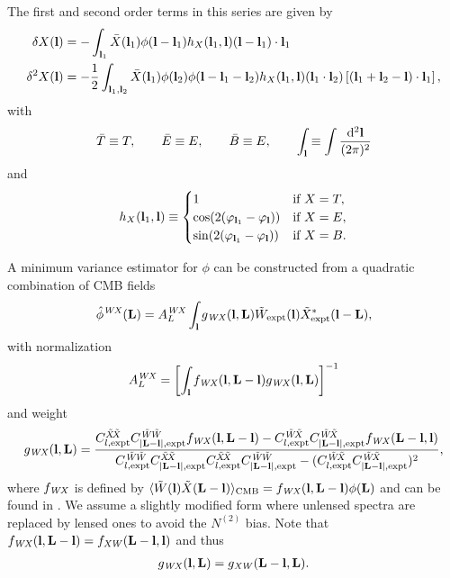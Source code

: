 \documentclass[prd,superscriptaddress,nofootinbib,floatfix,notitlepage]{revtex4-1}
\begin{document}
The first and second order terms in this series are given by
\begin{align}
  \label{eq:21}
  \delta X({\bf l}) &= -\int_{{\bf l}_1}\bar{X}({\bf l}_1)\phi({\bf l}-{\bf l}_1)h_X({\bf l}_1,{\bf l})({\bf l}-{\bf l}_1)\cdot {\bf l}_1 \\
  \delta^2 X({\bf l}) &= -\frac{1}{2}\int_{{\bf l}_1,{\bf l}_2}\bar{X}({\bf l}_1)\phi({\bf l}_2)\phi({\bf l}-{\bf l}_1-{\bf l}_2)h_X({\bf l}_1,{\bf l})({\bf l}_1\cdot{\bf l}_2)\left[({\bf l}_1+{\bf l}_2-{\bf l})\cdot{\bf l}_1\right],
\end{align}
with
\begin{equation}
  \label{eq:22}
  \bar{T}\equiv T,\qquad\bar{E}\equiv E,\qquad \bar{B} \equiv E,\qquad \int_{\bf l}\equiv\int\frac{{\rm d}^2 {\bf l}}{(2\pi)^2}
\end{equation}
and
\begin{equation}
  \label{eq:hXDef}
  h_X({\bf l}_1,{\bf l}) \equiv 
  \begin{cases}
    1 & \mbox{if } X=T, \\
    \cos(2(\varphi_{{\bf l}_1}-\varphi_{\bf l})) &  \mbox{if } X=E, \\
    \sin(2(\varphi_{{\bf l}_1}-\varphi_{\bf l})) & \mbox{if } X=B.
  \end{cases}
\end{equation}

A minimum variance estimator for $\phi$ can be constructed from a quadratic combination of CMB fields \cite{Hu0111606}
\begin{equation}
    \label{eq:QuadEsti}
    \hat\phi^{\mathit{WX}}({\bf L}) = A_L^{\mathit{WX}}\int_{\bf l} g_{\mathit{WX}}({\bf l},{\bf L})\tilde W_{\mathrm{expt}}({\bf l})\tilde{X}^*_{\mathrm{expt}}({\bf l}-{\bf L}),
\end{equation}
with normalization
\begin{equation}
\label{eq:24}
  A_L^{\mathit{WX}} = \left[\int_{\bf l} f_{\mathit{WX}}({\bf l},{\bf L}-{\bf l})g_{\mathit{WX}}({\bf l},{\bf L})\right]^{-1}
\end{equation}
and weight
\begin{equation}
\label{eq:25}
g_\WX(\vl,\VL) = \frac{C_{l,\expt}^\tXX C_{|\VL-\vl|,\expt}^\tWW f_\WX(\vl,\VL-\vl) - C_{l,\expt}^\tWX C^\tWX_{|\VL-\vl|,\expt}f_\WX(\VL-\vl,\vl)}{C_{l,\expt}^\tWW C^\tXX_{|\VL-\vl|,\expt}C^\tXX_{l,\expt}C^\tWW_{|\VL-\vl|,\expt} - (C^\tWX_{l,\expt}C^\tWX_{|\VL-\vl|,\expt})^2},
\end{equation}
where $f_{\mathit{WX}}$ is defined by $\langle \tilde W({\bf l})\tilde X({\bf L}-{\bf l})\rangle_\mathrm{CMB}=f_{\mathit{WX}}({\bf l},{\bf L}-{\bf l})\phi({\bf L})$ and can be found in \cite{Hu0111606}. We assume a slightly modified form where unlensed spectra are replaced by lensed ones \cite{hanson1008} to avoid the $N^{(2)}$ bias.  Note that $f_{\mathit{WX}}({\bf l},{\bf L}-{\bf l})=f_\mathit{XW}({\bf L}-{\bf l},{\bf l})$ and thus 
\begin{align}
\label{eq:gSymmetry}
g_{\mathit{WX}}({\bf l},{\bf L})=g_\mathit{XW}({\bf L}-{\bf l},{\bf L}).   
\end{align}
\end{document}
